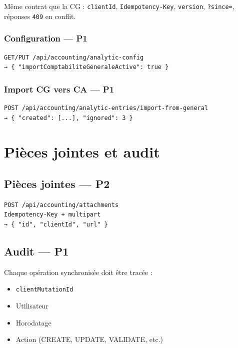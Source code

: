 \documentclass[12pt,a4paper]{report}
\begin{document}
Même contrat que la CG : \texttt{clientId}, \texttt{Idempotency-Key}, \texttt{version}, \texttt{?since=}, réponses \texttt{409} en conflit.

\subsection{Configuration --- P1}

\begin{verbatim}
GET/PUT /api/accounting/analytic-config
→ { "importComptabiliteGeneraleActive": true }
\end{verbatim}

\subsection{Import CG vers CA --- P1}

\begin{verbatim}
POST /api/accounting/analytic-entries/import-from-general
→ { "created": [...], "ignored": 3 }
\end{verbatim}

\chapter{Pièces jointes et audit}

\section{Pièces jointes --- P2}

\begin{verbatim}
POST /api/accounting/attachments
Idempotency-Key + multipart
→ { "id", "clientId", "url" }
\end{verbatim}

\section{Audit --- P1}

Chaque opération synchronisée doit être tracée :
\begin{itemize}
  \item \texttt{clientMutationId}
  \item Utilisateur
  \item Horodatage
  \item Action (CREATE, UPDATE, VALIDATE, etc.)
\end{itemize}
\end{document}
